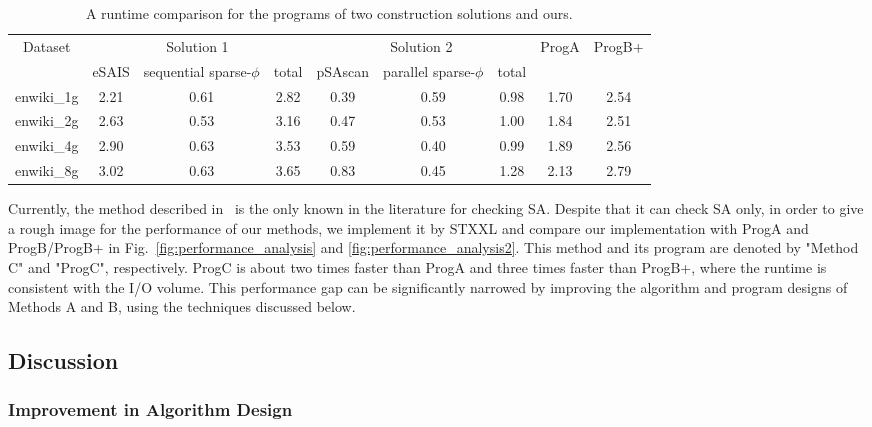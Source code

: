 \documentclass[10pt,journal,compsoc]{IEEEtran}
\begin{document}
\renewcommand\arraystretch{1.3}
\begin{table}[h]
	\caption{A runtime comparison for the programs of two construction solutions and ours.}
	\label{tbl:3}
	\centering
	\begin{tabular}{|c|c|c|c|c|c|c|c|c|}
		\hline
		\multirow{2}{*}{Dataset} & \multicolumn{3}{|c|}{Solution 1} & \multicolumn{3}{c|}{Solution 2} & \multirow{2}{*}{ProgA} & \multirow{2}{*}{ProgB+} \\\cline{2-7}
		 & eSAIS & sequential sparse-$\phi$ & total & pSAscan & parallel sparse-$\phi$ & total & & \\\hline
		enwiki\_1g & 2.21 & 0.61 & 2.82 & 0.39 & 0.59 & 0.98 & 1.70 & 2.54 \\\hline
		enwiki\_2g & 2.63 & 0.53 & 3.16 & 0.47 & 0.53 & 1.00 & 1.84 & 2.51 \\\hline
		enwiki\_4g & 2.90 & 0.63 & 3.53 & 0.59 & 0.40 & 0.99 & 1.89 & 2.56 \\\hline
		enwiki\_8g & 3.02 & 0.63 & 3.65 & 0.83 & 0.45 & 1.28 & 2.13 & 2.79 \\\hline
	\end{tabular}
\end{table}


Currently, the method described in~\cite{Burkhardt2003} is the only known in the literature for checking SA. Despite that it can check SA only, in order to give a rough image for the performance of our methods, we implement it by STXXL and compare our implementation with ProgA and ProgB/ProgB+ in Fig.~\ref{fig:performance_analysis} and \ref{fig:performance_analysis2}. This method and its program are denoted by "Method C" and "ProgC", respectively. ProgC is about two times faster than ProgA and three times faster than ProgB+, where the runtime is consistent with the I/O volume. This performance gap can be significantly narrowed by improving the algorithm and program designs of Methods A and B, using the techniques discussed below.


\subsection{Discussion} \label{sec:experiments:discussion}

\subsubsection{Improvement in Algorithm Design} \label{sec:experiments:discussion:improve_algorithm_design}
\end{document}
